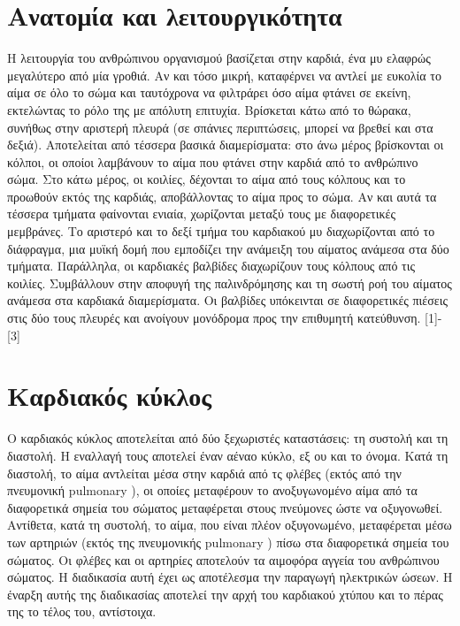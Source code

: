 \documentclass{report}
\newcommand \en {\selectlanguage{english}}
\newcommand \gr {\selectlanguage{greek}}
\begin{document}
\section{Ανατομία και λειτουργικότητα}
Η λειτουργία του ανθρώπινου οργανισμού βασίζεται στην καρδιά, ένα μυ ελαφρώς μεγαλύτερο από μία γροθιά. Αν και τόσο μικρή, καταφέρνει να αντλεί με ευκολία το αίμα σε όλο το σώμα και ταυτόχρονα να φιλτράρει όσο αίμα φτάνει σε εκείνη, εκτελώντας το ρόλο της με απόλυτη επιτυχία. Βρίσκεται κάτω από το θώρακα, συνήθως στην αριστερή πλευρά (σε σπάνιες περιπτώσεις, μπορεί να βρεθεί και στα δεξιά). Αποτελείται από τέσσερα βασικά διαμερίσματα: στο άνω μέρος βρίσκονται οι κόλποι, οι οποίοι λαμβάνουν το αίμα που φτάνει στην καρδιά από το ανθρώπινο σώμα. Στο κάτω μέρος, οι κοιλίες, δέχονται το αίμα από τους κόλπους και το προωθούν εκτός της καρδιάς, αποβάλλοντας το αίμα προς το σώμα. Αν και αυτά τα τέσσερα τμήματα φαίνονται ενιαία, χωρίζονται μεταξύ τους με διαφορετικές μεμβράνες. Το αριστερό και το δεξί τμήμα του καρδιακού μυ διαχωρίζονται από το διάφραγμα, μια μυϊκή δομή που εμποδίζει την ανάμειξη του αίματος ανάμεσα στα δύο τμήματα. Παράλληλα, οι καρδιακές βαλβίδες διαχωρίζουν τους κόλπους από τις κοιλίες. Συμβάλλουν στην αποφυγή της παλινδρόμησης και τη σωστή ροή του αίματος ανάμεσα στα καρδιακά διαμερίσματα. Οι βαλβίδες υπόκεινται σε διαφορετικές πιέσεις στις δύο τους πλευρές και ανοίγουν μονόδρομα προς την επιθυμητή κατεύθυνση. [1]-[3]

\section{Καρδιακός κύκλος}
Ο καρδιακός κύκλος αποτελείται από δύο ξεχωριστές καταστάσεις: τη συστολή και τη διαστολή. Η εναλλαγή τους αποτελεί έναν αέναο κύκλο, εξ ου και το όνομα. Κατά τη διαστολή, το αίμα αντλείται μέσα στην καρδιά από τς φλέβες (εκτός από την πνευμονική \en pulmonary \gr), οι οποίες μεταφέρουν το ανοξυγωνομένο αίμα από τα διαφορετικά σημεία του σώματος μεταφέρεται στους πνεύμονες ώστε να οξυγονωθεί. 
Αντίθετα, κατά τη συστολή, το αίμα, που είναι πλέον οξυγονωμένο, μεταφέρεται μέσω των αρτηριών (εκτός της πνευμονικής \en pulmonary \gr) πίσω στα διαφορετικά σημεία του σώματος. Οι φλέβες και οι αρτηρίες αποτελούν τα αιμοφόρα αγγεία του ανθρώπινου σώματος. Η διαδικασία αυτή έχει ως αποτέλεσμα την παραγωγή ηλεκτρικών ώσεων. Η έναρξη αυτής της διαδικασίας αποτελεί την αρχή του καρδιακού χτύπου και το πέρας της το τέλος του, αντίστοιχα. 
\end{document}
